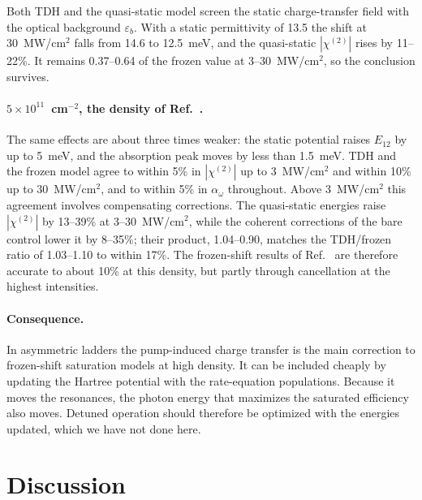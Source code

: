 \documentclass[11pt]{article}
\newcommand{\chitwo}{\chi^{(2)}}
\newcommand{\aw}{\alpha_{\omega}}
\begin{document}
Both TDH and the quasi-static model screen the static charge-transfer field with the optical background $\varepsilon_b$. With a static permittivity of 13.5 the shift at 30~MW/cm$^2$ falls from 14.6 to 12.5~meV, and the quasi-static $|\chitwo|$ rises by 11--22\%. It remains 0.37--0.64 of the frozen value at 3--30~MW/cm$^2$, so the conclusion survives.

\paragraph{$5\times10^{11}$~cm$^{-2}$, the density of Ref.~\cite{OwnbyNL02}.} The same effects are about three times weaker: the static potential raises $E_{12}$ by up to 5~meV, and the absorption peak moves by less than 1.5~meV. TDH and the frozen model agree to within 5\% in $|\chitwo|$ up to 3~MW/cm$^2$ and within 10\% up to 30~MW/cm$^2$, and to within 5\% in $\aw$ throughout. Above 3~MW/cm$^2$ this agreement involves compensating corrections. The quasi-static energies raise $|\chitwo|$ by 13--39\% at 3--30~MW/cm$^2$, while the coherent corrections of the bare control lower it by 8--35\%; their product, 1.04--0.90, matches the TDH/frozen ratio of 1.03--1.10 to within 17\%. The frozen-shift results of Ref.~\cite{OwnbyNL02} are therefore accurate to about 10\% at this density, but partly through cancellation at the highest intensities.

\paragraph{Consequence.} In asymmetric ladders the pump-induced charge transfer is the main correction to frozen-shift saturation models at high density. It can be included cheaply by updating the Hartree potential with the rate-equation populations. Because it moves the resonances, the photon energy that maximizes the saturated efficiency also moves. Detuned operation \cite{OwnbyNL02} should therefore be optimized with the energies updated, which we have not done here.

\section{Discussion}\label{sec:disc}
\end{document}
